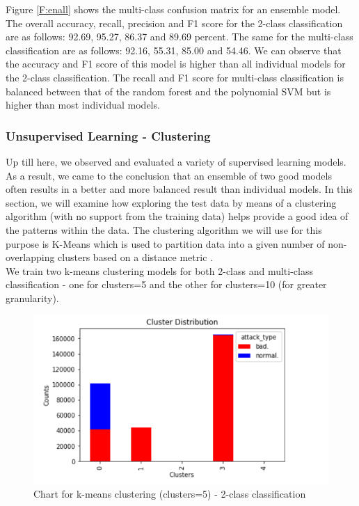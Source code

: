 Figure \ref{F:enall} shows the multi-class confusion matrix for an ensemble model.\\
The overall accuracy, recall, precision and F1 score for the 2-class classification are as follows: 92.69, 95.27, 86.37 and 89.69 percent. The same for the multi-class classification are as follows: 92.16, 55.31, 85.00
and 54.46. We can observe that the accuracy and F1 score of this model is  higher than all individual models for the 2-class classification. The recall and F1 score for multi-class classification is balanced between that of the random forest and the polynomial SVM but is higher than most individual models.

\subsubsection{Unsupervised Learning - Clustering}
Up till here, we observed and evaluated a variety of supervised learning models. As a result, we came to the conclusion that an ensemble of two good models often results in a better and more balanced result than individual models. In this section, we will examine how exploring the test data by means of a clustering algorithm (with no support from the training data) helps provide a good idea of the patterns within the data. The clustering algorithm we will use for this purpose is K-Means which is used to partition data into a given number of non-overlapping clusters based on a distance metric \cite{islr09}.\\
We train two k-means clustering models for both 2-class and multi-class classification - one for clusters=5 and the other for clusters=10 (for greater granularity). \\
\begin{figure}
	\includegraphics[width=1.0\columnwidth]{images/cluster52graph.PNG}
	\caption{Chart for k-means clustering (clusters=5) - 2-class classification}
	\label{F:cg52}
\end{figure}
